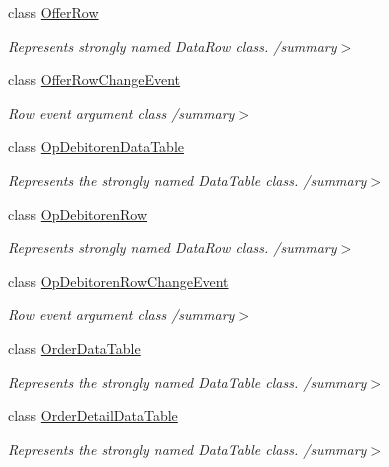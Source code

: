 \begin{DoxyCompactItemize}
class \hyperlink{class_products_1_1_data_1_1ds_sage_1_1_offer_row}{Offer\+Row}
\begin{DoxyCompactList}\small\item\em Represents strongly named Data\+Row class. /summary$>$ \end{DoxyCompactList}\item 
class \hyperlink{class_products_1_1_data_1_1ds_sage_1_1_offer_row_change_event}{Offer\+Row\+Change\+Event}
\begin{DoxyCompactList}\small\item\em Row event argument class /summary$>$ \end{DoxyCompactList}\item 
class \hyperlink{class_products_1_1_data_1_1ds_sage_1_1_op_debitoren_data_table}{Op\+Debitoren\+Data\+Table}
\begin{DoxyCompactList}\small\item\em Represents the strongly named Data\+Table class. /summary$>$ \end{DoxyCompactList}\item 
class \hyperlink{class_products_1_1_data_1_1ds_sage_1_1_op_debitoren_row}{Op\+Debitoren\+Row}
\begin{DoxyCompactList}\small\item\em Represents strongly named Data\+Row class. /summary$>$ \end{DoxyCompactList}\item 
class \hyperlink{class_products_1_1_data_1_1ds_sage_1_1_op_debitoren_row_change_event}{Op\+Debitoren\+Row\+Change\+Event}
\begin{DoxyCompactList}\small\item\em Row event argument class /summary$>$ \end{DoxyCompactList}\item 
class \hyperlink{class_products_1_1_data_1_1ds_sage_1_1_order_data_table}{Order\+Data\+Table}
\begin{DoxyCompactList}\small\item\em Represents the strongly named Data\+Table class. /summary$>$ \end{DoxyCompactList}\item 
class \hyperlink{class_products_1_1_data_1_1ds_sage_1_1_order_detail_data_table}{Order\+Detail\+Data\+Table}
\begin{DoxyCompactList}\small\item\em Represents the strongly named Data\+Table class. /summary$>$ \end{DoxyCompactList}\item 

\end{DoxyCompactItemize}
